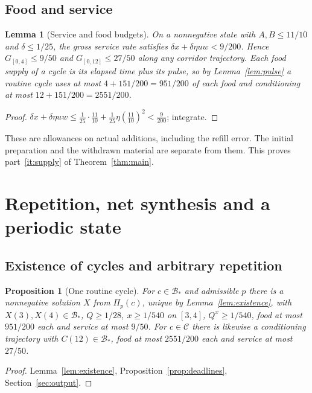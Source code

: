 \documentclass[11pt,a4paper]{article}
\theoremstyle{plain}
\newtheorem{proposition}[theorem]{Proposition}
\newtheorem{lemma}[theorem]{Lemma}
\theoremstyle{definition}
\theoremstyle{remark}
\newcommand{\Adm}{\mathcal C}
\newcommand{\Bstar}{\mathcal B_*}
\newcommand{\Pulse}{\Pi}
\begin{document}
\subsection{Food and service}
\begin{lemma}[Service and food budgets]\label{lem:supply}
On a nonnegative state with $A,B\le11/10$ and $\delta\le1/25$, the gross service rate satisfies $\delta x+\delta\eta uw<9/200$. Hence $G_{[0,4]}\le9/50$ and $G_{[0,12]}\le27/50$ along any corridor trajectory. Each food supply of a cycle is its elapsed time plus its pulse, so by Lemma~\ref{lem:pulse} a routine cycle uses at most $4+151/200=951/200$ of each food and conditioning at most $12+151/200=2551/200$.
\end{lemma}
\begin{proof}
$\delta x+\delta\eta uw\le\tfrac1{25}\cdot\tfrac{11}{10}+\tfrac1{25}\eta(\tfrac{11}{10})^2<\tfrac9{200}$; integrate.
\end{proof}
These are allowances on actual additions, including the refill error. The initial preparation and the withdrawn material are separate from them. This proves part~\ref{it:supply} of Theorem~\ref{thm:main}.

\section{Repetition, net synthesis and a periodic state}\label{sec:repetition}

\subsection{Existence of cycles and arbitrary repetition}
\begin{proposition}[One routine cycle]\label{prop:cycle}
For $c\in\Bstar$ and admissible $p$ there is a nonnegative solution $X$ from $\Pulse_p(c)$, unique by Lemma~\ref{lem:existence}, with $X(3),X(4)\in\Bstar$, $Q\ge1/28$, $x\ge1/540$ on $[3,4]$, $Q^x\ge1/540$, food at most $951/200$ each and service at most $9/50$. For $c\in\Adm$ there is likewise a conditioning trajectory with $C(12)\in\Bstar$, food at most $2551/200$ each and service at most $27/50$.
\end{proposition}
\begin{proof}
Lemma~\ref{lem:existence}, Proposition~\ref{prop:deadlines}, Section~\ref{sec:output}.
\end{proof}
\end{document}
